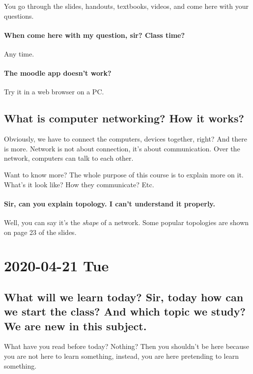 \documentclass{article}
\begin{document}
You go through the slides, handouts, textbooks, videos, and come here with your questions.

\paragraph{When come here with my question, sir? Class time?} Any time.

\paragraph{The moodle app doesn't work?} Try it in a web browser on a PC.

\subsection[What is networking?]{What is computer networking? How it works?}
\label{sec:whatis}

Obviously, we have to connect the computers, devices together, right? And there is
more. Network is not about connection, it's about communication.  Over the network,
computers can talk to each other.

Want to know more? The whole purpose of this course is to explain more on it.  What's it
look like? How they communicate? Etc.

\paragraph{Sir, can you explain topology. I can't understand it properly.}

Well, you can say it's the \emph{shape} of a network. Some popular topologies
are shown on page 23 of the slides.

\section{2020-04-21 Tue}

\subsection[What's in today's class?]{What will we learn today? Sir, today how can we
  start the class? And which topic we study? We are new in this subject.}
\label{sec:today}

What have you read before today? Nothing? Then you shouldn't be here because you
are not here to learn something, instead, you are here pretending to learn something.
\end{document}

